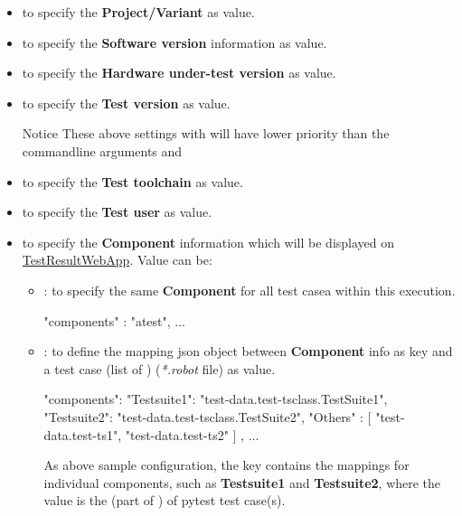 \begin{itemize}
          \begin{itemize}
            \item {} to specify the \textbf{Project/Variant} as 
                   value.
            \item {} to specify the \textbf{Software version} 
                  information as  value.
            \item {} to specify the 
                  \textbf{Hardware under-test version} as  value.
            \item {} to specify the \textbf{Test version} as 
                   value.
            \begin{boxhint} {Notice}
              These above settings with  will have lower 
              priority than the commandline arguments  
              and 
            \end{boxhint}
            \item {} to specify the \textbf{Test toolchain} as 
                   value.
            \item {} to specify the \textbf{Test user} as 
                   value.
            \item {} to specify the \textbf{Component} 
                  information which will be displayed on 
                  \href{https://github.com/test-fullautomation/testresultwebapp}
                  {TestResultWebApp}. Value can be:
              \begin{itemize}
                \item {}: to specify the same \textbf{Component} 
                      for all test casea within this execution.
\begin{robotcode}
{
  "components" : "atest",
  ...
}
\end{robotcode}
                \item {}: to define the mapping json object between 
                      \textbf{Component} info as key and a test case 
                       (list of ) 
                      (\emph{*.robot} file) as value.
\begin{robotcode}
{
  "components": {
    "Testsuite1": "test-data.test-tsclass.TestSuite1",
    "Testsuite2": "test-data.test-tsclass.TestSuite2",
    "Others"    : [
        "test-data.test-ts1",
        "test-data.test-ts2"
    ]
  },
  ...
}
\end{robotcode}
                As above sample configuration, the  key 
                contains the mappings for individual components, such as 
                \textbf{Testsuite1} and \textbf{Testsuite2}, where the value 
                is the  (part of ) of pytest 
                test case(s).


\end{itemize}
\end{itemize}
\end{itemize}
